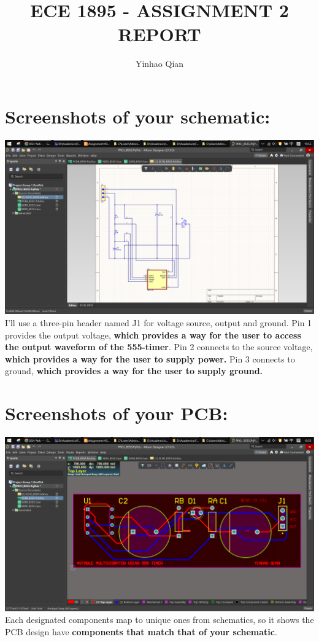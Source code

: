 \documentclass{article}
\title{ECE 1895 - ASSIGNMENT 2 REPORT}
\author{Yinhao Qian}
\begin{document}
	\maketitle
	\section{Screenshots of your schematic:}
	\includegraphics[width=\columnwidth]{SCHE_B555}
	I'll use a three-pin header named J1 for voltage source, output and ground. 
	Pin 1 provides the output voltage, \textbf{which provides a way for the user to access the output waveform of the 555-timer}. Pin 2 connects to the source voltage, \textbf{which provides a way for the user to supply power.} Pin 3 connects to ground, \textbf{which provides a way for the user to supply ground.}
	\section{Screenshots of your PCB:}
	\includegraphics[width=\columnwidth]{PCBB_B555}
	Each designated components map to unique ones from schematics, so it shows the PCB design have \textbf{components that match that of your schematic}.\newline\newline
\end{document}
